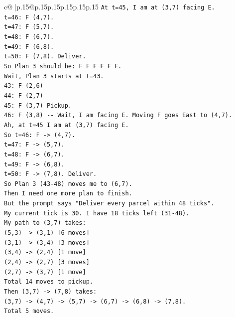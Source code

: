 \documentclass{article}
\begin{document}
{\begin{supertabular}{c@{$\;$}|p{.15\linewidth}@{}p{.15\linewidth}p{.15\linewidth}p{.15\linewidth}p{.15\linewidth}p{.15\linewidth}}
{{{\texttt{At t=45, I am at (3,7) facing E.} \\
\texttt{t=46: F (4,7).} \\
\texttt{t=47: F (5,7).} \\
\texttt{t=48: F (6,7).} \\
\texttt{t=49: F (6,8).} \\
\texttt{t=50: F (7,8). Deliver.} \\
\texttt{So Plan 3 should be: F F F F F F.} \\
\texttt{Wait, Plan 3 starts at t=43.} \\
\texttt{43: F (2,6)} \\
\texttt{44: F (2,7)} \\
\texttt{45: F (3,7) Pickup.} \\
\texttt{46: F (3,8) {-}{-} Wait, I am facing E. Moving F goes East to (4,7).} \\
\texttt{Ah, at t=45 I am at (3,7) facing E.} \\
\texttt{So t=46: F {-}> (4,7).} \\
\texttt{t=47: F {-}> (5,7).} \\
\texttt{t=48: F {-}> (6,7).} \\
\texttt{t=49: F {-}> (6,8).} \\
\texttt{t=50: F {-}> (7,8). Deliver.} \\
\texttt{So Plan 3 (43{-}48) moves me to (6,7).} \\
\texttt{Then I need one more plan to finish.} \\
\texttt{But the prompt says "Deliver every parcel within 48 ticks".} \\
\texttt{My current tick is 30. I have 18 ticks left (31{-}48).} \\
\texttt{My path to (3,7) takes:} \\
\texttt{(5,3) {-}> (3,1) {[}6 moves{]}} \\
\texttt{(3,1) {-}> (3,4) {[}3 moves{]}} \\
\texttt{(3,4) {-}> (2,4) {[}1 move{]}} \\
\texttt{(2,4) {-}> (2,7) {[}3 moves{]}} \\
\texttt{(2,7) {-}> (3,7) {[}1 move{]}} \\
\texttt{Total 14 moves to pickup.} \\
\texttt{Then (3,7) {-}> (7,8) takes:} \\
\texttt{(3,7) {-}> (4,7) {-}> (5,7) {-}> (6,7) {-}> (6,8) {-}> (7,8).} \\
\texttt{Total 5 moves.} \\
}}}
\end{supertabular}}
\end{document}
